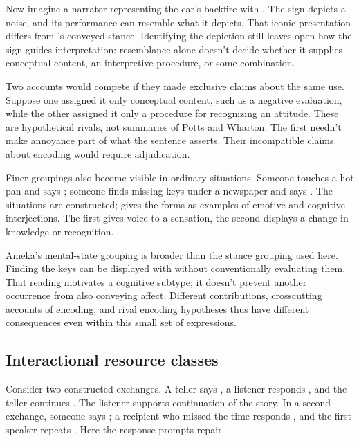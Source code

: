 \documentclass[12pt]{article}
\begin{document}
Now imagine a narrator representing the car's backfire with .
The sign depicts a noise, and its performance can resemble what it
depicts. That iconic presentation differs from 's conveyed
stance. Identifying the depiction still leaves open how the sign guides
interpretation: resemblance alone doesn't decide whether it supplies
conceptual content, an interpretive procedure, or some combination.

Two accounts would compete if they made exclusive claims
about the same  use. Suppose one assigned it only
conceptual content, such as a negative evaluation, while the other
assigned it only a procedure for recognizing an attitude. These are
hypothetical rivals, not summaries of Potts and Wharton. The first
needn't make annoyance part of what the sentence asserts. Their
incompatible claims about encoding would require adjudication.

Finer groupings also become visible in ordinary situations. Someone
touches a hot pan and says ; someone finds missing keys
under a newspaper and says . The situations are constructed;
\textcite[113]{ameka1992} gives the forms as examples of emotive and
cognitive interjections. The first gives voice to a sensation, the
second displays a change in knowledge or recognition.

Ameka's mental-state grouping is broader than the stance grouping used
here. Finding the keys can be displayed with  without
conventionally evaluating them. That reading motivates a cognitive subtype;
it doesn't prevent another occurrence from also conveying affect.
Different contributions, crosscutting accounts of encoding, and rival
encoding hypotheses thus have different consequences even within this
small set of expressions.

\subsection{Interactional resource classes}

Consider two constructed exchanges. A teller says , a listener responds , and the teller continues
. The listener supports continuation of the
story. In a second exchange, someone says ;
a recipient who missed the time responds , and the first
speaker repeats . Here the response prompts repair.
\end{document}
